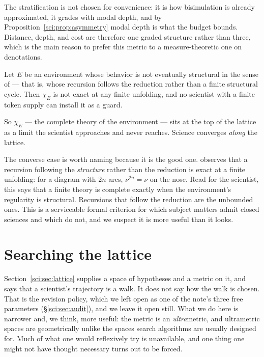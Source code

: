 The stratification is not chosen for convenience: it is how bisimulation is already approximated, it
grades with modal depth, and by Proposition~\ref{sci:prop:asymmetry} modal depth is what the budget
bounds. Distance, depth, and cost are therefore one graded structure rather than three, which is the
main reason to prefer this metric to a measure-theoretic one on denotations.

\begin{proposition}
\label{sci:prop:limit}
Let $E$ be an environment whose behavior is not eventually structural in the sense of
\cite[Rem.~6]{ClassifierNote} --- that is, whose recursion follows the reduction rather than a finite
structural cycle. Then $\chi_E$ is not exact at any finite unfolding, and no scientist with a finite
token supply can install it as a guard.
\end{proposition}

So $\chi_E$ --- the complete theory of the environment --- sits at the top of the lattice as a limit
the scientist approaches and never reaches. Science converges \emph{along} the lattice.

\begin{remark}
\label{sci:rem:structural}
The converse case is worth naming because it is the good one. \cite[Rem.~6]{ClassifierNote} observes
that a recursion following the \emph{structure} rather than the reduction is exact at a finite
unfolding: for a diagram with $2n$ arcs, $\nu^{2n} = \nu$ on the nose. Read for the scientist, this
says that a finite theory is complete exactly when the environment's regularity is structural.
Recursions that follow the reduction are the unbounded ones. This is a serviceable formal criterion
for which subject matters admit closed sciences and which do not, and we suspect it is more useful
than it looks.
\end{remark}

\section{Searching the lattice}\label{sci:S6}
\label{sci:sec:search}

Section~\ref{sci:sec:lattice} supplies a space of hypotheses and a metric on it, and says that a scientist's
trajectory is a walk. It does not say how the walk is chosen. That is the revision policy, which we
left open as one of the note's three free parameters (\S\ref{sci:sec:audit}), and we leave it open still.
What we do here is narrower and, we think, more useful: the metric is an \emph{ultra}metric, and
ultrametric spaces are geometrically unlike the spaces search algorithms are usually designed for. Much
of what one would reflexively try is unavailable, and one thing one might not have thought necessary
turns out to be forced.

